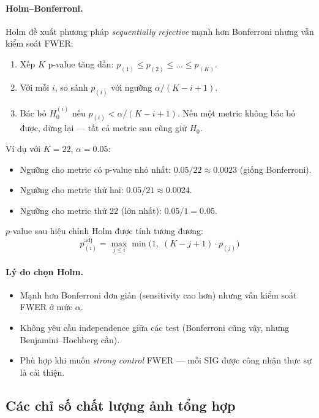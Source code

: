 \paragraph{Holm--Bonferroni.}
Holm \cite{holm1979simple} đề xuất phương pháp \emph{sequentially rejective} mạnh hơn Bonferroni nhưng vẫn kiểm soát FWER:
\begin{enumerate}\itemsep0pt
    \item Xếp $K$ p-value tăng dần: $p_{(1)} \le p_{(2)} \le \ldots \le p_{(K)}$.
    \item Với mỗi $i$, so sánh $p_{(i)}$ với ngưỡng $\alpha / (K - i + 1)$.
    \item Bác bỏ $H_0^{(i)}$ nếu $p_{(i)} < \alpha / (K - i + 1)$. Nếu một metric không bác bỏ được, dừng lại --- tất cả metric sau cũng giữ $H_0$.
\end{enumerate}

Ví dụ với $K = 22$, $\alpha = 0.05$:
\begin{itemize}\itemsep0pt
    \item Ngưỡng cho metric có p-value nhỏ nhất: $0.05 / 22 \approx 0.0023$ (giống Bonferroni).
    \item Ngưỡng cho metric thứ hai: $0.05 / 21 \approx 0.0024$.
    \item Ngưỡng cho metric thứ 22 (lớn nhất): $0.05 / 1 = 0.05$.
\end{itemize}
$p$-value sau hiệu chỉnh Holm được tính tương đương:
\begin{equation}
p_{(i)}^{\mathrm{adj}} = \max_{j \le i} \min\big(1,\; (K - j + 1) \cdot p_{(j)}\big)
\end{equation}

\paragraph{Lý do chọn Holm.}
\begin{itemize}\itemsep0pt
    \item Mạnh hơn Bonferroni đơn giản (sensitivity cao hơn) nhưng vẫn kiểm soát FWER ở mức $\alpha$.
    \item Không yêu cầu independence giữa các test (Bonferroni cũng vậy, nhưng Benjamini--Hochberg cần).
    \item Phù hợp khi muốn \emph{strong control} FWER --- mỗi SIG được công nhận thực sự là cải thiện.
\end{itemize}

\subsection{Các chỉ số chất lượng ảnh tổng hợp}
\label{ssec:metrics}

